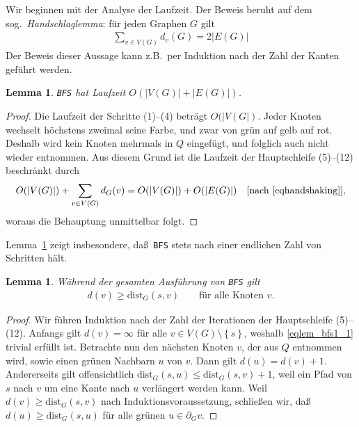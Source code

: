 \documentclass[10pt,reqno]{amsart}
\numberwithin{equation}{section}
\newtheorem{lemma}[definition]{Lemma}
\newcommand\dist{\mathrm{dist}}
\newcommand\cbc[1]{\left\{{#1}\right\}}
\newcommand\Lem{Lemma}
\begin{document}
Wir beginnen mit der Analyse der Laufzeit.
Der Beweis beruht auf dem sog.\ {\em Handschlaglemma}: f\"ur jeden Graphen $G$ gilt
\begin{align}\label{eqhandshaking}
	\sum_{v\in V(G)}d_v(G)=2|E(G)|
\end{align}
Der Beweis dieser Aussage kann z.B.\ per Induktion nach der Zahl der Kanten gef\"uhrt werden.

\begin{lemma}\label{lem_bfs0}
	{\tt BFS} hat Laufzeit $O(|V(G)|+|E(G)|)$.
\end{lemma}
\begin{proof}
	Die Laufzeit der Schritte (1)--(4) betr\"agt $O(|V(G|)$.
	Jeder Knoten wechselt h\"ochstens zweimal seine Farbe, und zwar von gr\"un auf gelb auf rot.
	Deshalb wird kein Knoten mehrmals in $Q$ eingef\"ugt, und folglich auch nicht wieder entnommen.
	Aus diesem Grund ist die Laufzeit der Hauptschleife (5)--(12) beschr\"ankt durch
	\begin{align*}
		O(|V(G)|)+\sum_{v\in V(G)}d_G(v)=O(|V(G)|)+O(|E(G)|)&&[\mbox{nach \eqref{eqhandshaking}}],
	\end{align*}
	woraus die Behauptung unmittelbar folgt.
\end{proof}

\Lem~\ref{lem_bfs0} zeigt insbesondere, da\ss\ {\tt BFS} stets nach einer endlichen Zahl von Schritten h\"alt.

\begin{lemma}\label{lem_bfs1}
	W\"ahrend der gesamten Ausf\"uhrung von {\tt BFS} gilt 
	\begin{align}\label{eqlem_bfs1_1}
	d(v)\geq\dist_G(s,v)\qquad\mbox{f\"ur alle Knoten $v$}.
	\end{align}
\end{lemma}
\begin{proof}
	Wir f\"uhren Induktion nach der Zahl der Iterationen der Hauptschleife (5)--(12).
	Anfangs gilt $d(v)=\infty$ f\"ur alle $v\in V(G)\setminus\cbc s$, weshalb \eqref{eqlem_bfs1_1} trivial erf\"ullt ist.
	Betrachte nun den n\"achsten Knoten $v$, der aus $Q$ entnommen wird, sowie einen gr\"unen Nachbarn $u$ von $v$.
	Dann gilt $d(u)=d(v)+1$.
	Andererseits gilt offensichtlich $\dist_G(s,u)\leq\dist_G(s,v)+1$, weil ein Pfad von $s$ nach $v$ um eine Kante nach $u$ verl\"angert werden kann.
	Weil $d(v)\geq\dist_G(s,v)$ nach Induktionsvoraussetzung, schlie\ss en wir, da\ss\ $d(u)\geq\dist_G(s,u)$ f\"ur alle gr\"unen $u\in\partial_Gv$.
\end{proof}
\end{document}
